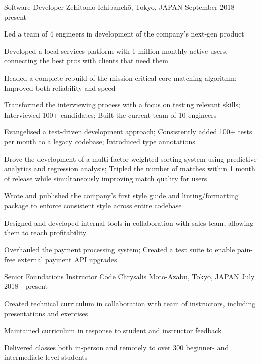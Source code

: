 
\begin{cventries}

  \cventry
  {Software Developer} %
  {Zehitomo} %
  {Ichibanchō, Tokyo, JAPAN} %
  {September 2018 - present} %
  {
    \begin{cvitems} %
      \item {Led a team of 4 engineers in development of the company's next-gen product}
      \item {Developed a local services platform with 1 million monthly active users, connecting the best pros with clients that need them}
      \item {Headed a complete rebuild of the mission critical core matching algorithm; Improved both reliability and speed}
      \item {Transformed the interviewing process with a focus on testing relevant skills; Interviewed 100+ candidates; Built the current team of 10 engineers}
      \item {Evangelised a test-driven development approach; Consistently added 100+ tests per month to a legacy codebase; Introduced type annotations}
      \item {Drove the development of a multi-factor weighted sorting system using predictive analytics and regression analysis; Tripled the number of matches within 1 month of release while simultaneously improving match quality for users}
      \item {Wrote and published the company's first style guide and linting/formatting package to enforce consistent style across entire codebase}
      \item {Designed and developed internal tools in collaboration with sales team, allowing them to reach profitability}
      \item {Overhauled the payment processing system; Created a test suite to enable pain-free external payment API upgrades}
    \end{cvitems}
  }

  \cventry
  {Senior Foundations Instructor} %
  {Code Chrysalis} %
  {Moto-Azabu, Tokyo, JAPAN} %
  {July 2018 - present} %
  {
    \begin{cvitems} %
      \item {Created technical curriculum in collaboration with team of instructors, including presentations and exercises}
      \item {Maintained curriculum in response to student and instructor feedback}
      \item {Delivered classes both in-person and remotely to over 300 beginner- and intermediate-level students}
    \end{cvitems}
  }


\end{cventries}
